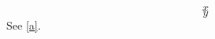 \documentclass{article}\makeatletter
\begin{document}
\begin{equation} x \label{a}\end{equation}
\begin{equation} y \end{equation}
See \ref{a}.
\end{document}
